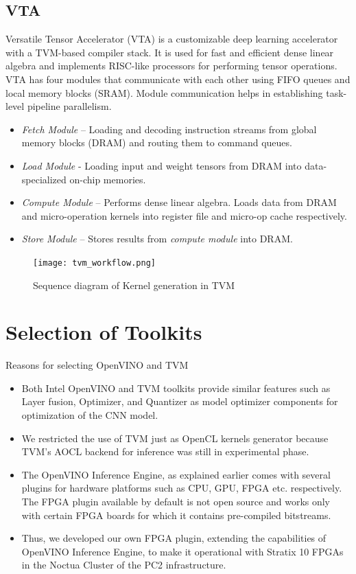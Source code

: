  \subsection{VTA}
 Versatile Tensor Accelerator (VTA) is a customizable deep learning accelerator with a TVM-based compiler stack. It is used for fast and efficient dense linear algebra and implements RISC-like processors for performing tensor operations.  VTA has four modules that communicate with each other using FIFO queues and local memory blocks (SRAM).  Module communication helps in establishing task-level pipeline parallelism.
\begin{itemize}
\item \textit{Fetch Module} – Loading and decoding instruction streams from global memory blocks (DRAM) and routing them to command queues.
\item \textit{Load Module} - Loading input and weight tensors from DRAM into data-specialized on-chip memories.
\item \textit{Compute Module} – Performs dense linear algebra. Loads data from DRAM and micro-operation kernels into register file and micro-op cache respectively.
\item \textit{Store Module} – Stores results from \textit{compute module} into DRAM.
 \end{itemize}
 
 \begin{figure}[h!]
    \centering
    \texttt{[image: tvm\_workflow.png]}
    \caption{Sequence diagram of Kernel generation in TVM}
\end{figure}
\pagebreak
 
 \section{Selection of Toolkits}
Reasons for selecting OpenVINO and TVM
 \begin{itemize}
 \item Both Intel OpenVINO and TVM toolkits provide similar features such as Layer fusion, Optimizer, and Quantizer as model optimizer components for optimization of the CNN model. 
 \item We restricted the use of TVM just as OpenCL kernels generator because TVM's AOCL backend for inference was still in experimental phase.
 \item The OpenVINO Inference Engine, as explained earlier comes with several plugins for hardware platforms such as CPU, GPU, FPGA etc. respectively. The FPGA plugin available by default is not open source and works only with certain FPGA boards for which it contains pre-compiled bitstreams. 
 \item Thus, we developed our own FPGA plugin, extending the capabilities of OpenVINO Inference Engine, to make it operational with Stratix 10 FPGAs in the Noctua Cluster of the PC2 infrastructure. 

 \end{itemize}